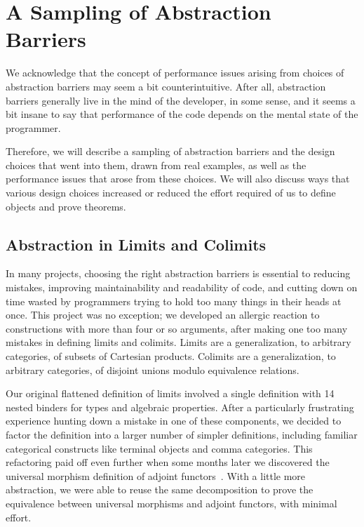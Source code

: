 \section{A Sampling of Abstraction Barriers}\label{sec:abstraction-barriers}

We acknowledge that the concept of performance issues arising from choices of abstraction barriers may seem a bit counterintuitive.
After all, abstraction barriers generally live in the mind of the developer, in some sense, and it seems a bit insane to say that performance of the code depends on the mental state of the programmer.

Therefore, we will describe a sampling of abstraction barriers and the design choices that went into them, drawn from real examples, as well as the performance issues that arose from these choices.
We will also discuss ways that various design choices increased or reduced the effort required of us to define objects and prove theorems.


\subsection{Abstraction in Limits and Colimits}\label{sec:abstraction:(co)limits}

In many projects, choosing the right abstraction barriers is essential to reducing mistakes, improving maintainability and readability of code, and cutting down on time wasted by programmers trying to hold too many things in their heads at once.
This project was no exception; we developed an allergic reaction to constructions with more than four or so arguments, after making one too many mistakes in defining limits and colimits.
Limits are a generalization, to arbitrary categories, of subsets of Cartesian products.
Colimits are a generalization, to arbitrary categories, of disjoint unions modulo equivalence relations.

Our original flattened definition of limits involved a single definition with 14 nested binders for types and algebraic properties.
After a particularly frustrating experience hunting down a mistake in one of these components, we decided to factor the definition into a larger number of simpler definitions, including familiar categorical constructs like terminal objects and comma categories.
This refactoring paid off even further when some months later we discovered the universal morphism definition of adjoint functors~\cite{wiki:adjoint-functors:universal-morphisms,ncatlab:adjoint+functor:UniversalArrows}.
With a little more abstraction, we were able to reuse the same decomposition to prove the equivalence between universal morphisms and adjoint functors, with minimal effort.

